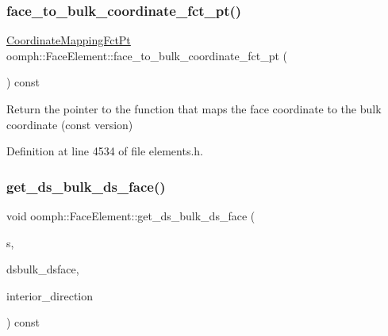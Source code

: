 \mbox{\label{classoomph_1_1FaceElement_a2168997e5ea9064d74e1c9ad220eba69}} 
\subsubsection{\texorpdfstring{face\+\_\+to\+\_\+bulk\+\_\+coordinate\+\_\+fct\+\_\+pt()}{face\_to\_bulk\_coordinate\_fct\_pt()}\hspace{0.1cm}{\footnotesize\ttfamily [2/2]}}
{\footnotesize\ttfamily \hyperlink{classoomph_1_1FaceElement_aaa3af8b5d2e9584bdcd9b133990d7591}{Coordinate\+Mapping\+Fct\+Pt} oomph\+::\+Face\+Element\+::face\+\_\+to\+\_\+bulk\+\_\+coordinate\+\_\+fct\+\_\+pt (\begin{DoxyParamCaption}{ }\end{DoxyParamCaption}) const\hspace{0.3cm}{\ttfamily [inline]}}



Return the pointer to the function that maps the face coordinate to the bulk coordinate (const version) 



Definition at line 4534 of file elements.\+h.

\mbox{\label{classoomph_1_1FaceElement_ac1e67f910b557da8ef2eb68977c17cad}} 
\subsubsection{\texorpdfstring{get\+\_\+ds\+\_\+bulk\+\_\+ds\+\_\+face()}{get\_ds\_bulk\_ds\_face()}}
{\footnotesize\ttfamily void oomph\+::\+Face\+Element\+::get\+\_\+ds\+\_\+bulk\+\_\+ds\+\_\+face (\begin{DoxyParamCaption}\item[{const \hyperlink{classoomph_1_1Vector}{Vector}$<$ double $>$ \&}]{s,  }\item[{\hyperlink{classoomph_1_1DenseMatrix}{Dense\+Matrix}$<$ double $>$ \&}]{dsbulk\+\_\+dsface,  }\item[{unsigned \&}]{interior\+\_\+direction }\end{DoxyParamCaption}) const}



